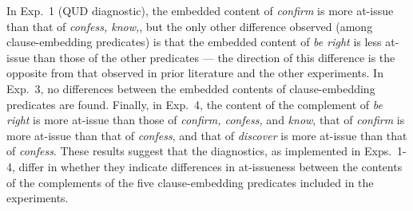 \documentclass[times,linguex,xcolor]{glossa}
\begin{document}
    In Exp.~1 (QUD diagnostic), the embedded content of \emph{confirm} is more at-issue than that of \emph{confess, know,}, but the only other difference observed (among clause-embedding predicates) is that the embedded content of \emph{be right} is less at-issue than those of the other predicates --- the direction of this difference is the opposite from that observed in prior literature and the other experiments. In Exp.~3, no differences between the embedded contents of clause-embedding predicates are found. Finally, in Exp.~4, the content of the complement of \emph{be right} is more at-issue than those of \emph{confirm, confess,} and \emph{know}, that of \emph{confirm} is more at-issue than that of \emph{confess}, and that of \emph{discover} is more at-issue than that of \emph{confess}. These results suggest that the diagnostics, as implemented in Exps.~1-4, differ in whether they indicate differences in at-issueness between the contents of the complements of the five clause-embedding predicates included in the experiments.
\end{document}

